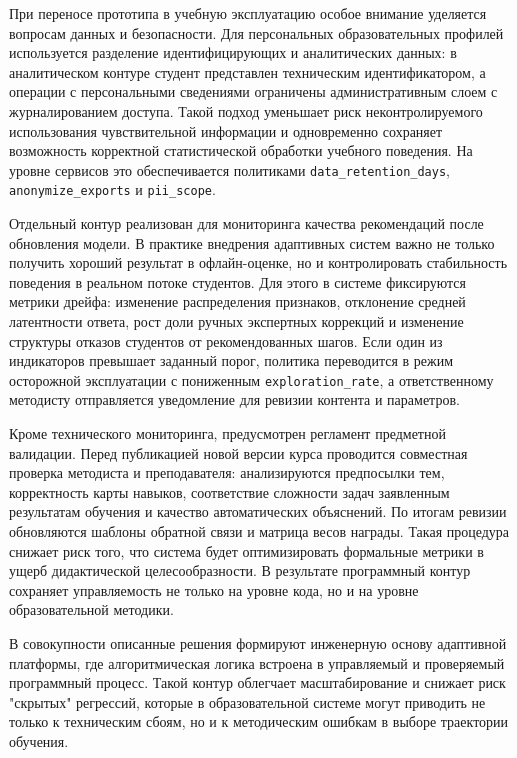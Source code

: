 При переносе прототипа в учебную эксплуатацию особое внимание уделяется
вопросам данных и безопасности. Для персональных образовательных профилей
используется разделение идентифицирующих и аналитических данных: в
аналитическом контуре студент представлен техническим идентификатором, а
операции с персональными сведениями ограничены административным слоем с
журналированием доступа. Такой подход уменьшает риск неконтролируемого
использования чувствительной информации и одновременно сохраняет возможность
корректной статистической обработки учебного поведения. На уровне сервисов это
обеспечивается политиками \texttt{data\_retention\_days},
\texttt{anonymize\_exports} и \texttt{pii\_scope}.

Отдельный контур реализован для мониторинга качества рекомендаций после
обновления модели. В практике внедрения адаптивных систем важно не только
получить хороший результат в офлайн-оценке, но и контролировать стабильность
поведения в реальном потоке студентов. Для этого в системе фиксируются метрики
дрейфа: изменение распределения признаков, отклонение средней латентности
ответа, рост доли ручных экспертных коррекций и изменение структуры отказов
студентов от рекомендованных шагов. Если один из индикаторов превышает заданный
порог, политика переводится в режим осторожной эксплуатации с пониженным
\texttt{exploration\_rate}, а ответственному методисту отправляется уведомление
для ревизии контента и параметров.

Кроме технического мониторинга, предусмотрен регламент предметной валидации.
Перед публикацией новой версии курса проводится совместная проверка методиста и
преподавателя: анализируются предпосылки тем, корректность карты навыков,
соответствие сложности задач заявленным результатам обучения и качество
автоматических объяснений. По итогам ревизии обновляются шаблоны обратной связи
и матрица весов награды. Такая процедура снижает риск того, что система будет
оптимизировать формальные метрики в ущерб дидактической целесообразности. В
результате программный контур сохраняет управляемость не только на уровне кода,
но и на уровне образовательной методики.

В совокупности описанные решения формируют инженерную основу адаптивной
платформы, где алгоритмическая логика встроена в управляемый и проверяемый
программный процесс. Такой контур облегчает масштабирование и снижает риск
"скрытых" регрессий, которые в образовательной системе могут приводить не
только к техническим сбоям, но и к методическим ошибкам в выборе траектории
обучения.
